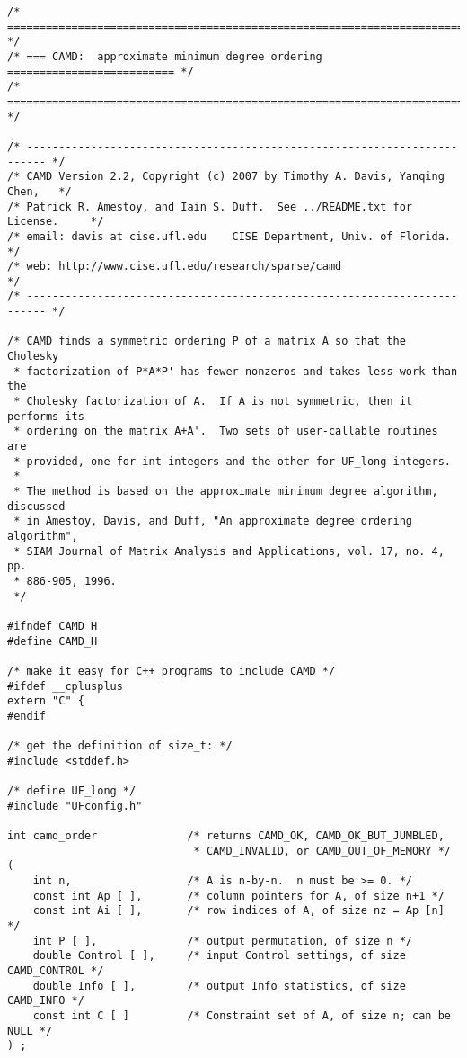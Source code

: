 \documentclass[11pt]{article}
\begin{document}
{\footnotesize
\begin{verbatim}
/* ========================================================================= */
/* === CAMD:  approximate minimum degree ordering ========================== */
/* ========================================================================= */

/* ------------------------------------------------------------------------- */
/* CAMD Version 2.2, Copyright (c) 2007 by Timothy A. Davis, Yanqing Chen,   */
/* Patrick R. Amestoy, and Iain S. Duff.  See ../README.txt for License.     */
/* email: davis at cise.ufl.edu    CISE Department, Univ. of Florida.        */
/* web: http://www.cise.ufl.edu/research/sparse/camd                         */
/* ------------------------------------------------------------------------- */

/* CAMD finds a symmetric ordering P of a matrix A so that the Cholesky
 * factorization of P*A*P' has fewer nonzeros and takes less work than the
 * Cholesky factorization of A.  If A is not symmetric, then it performs its
 * ordering on the matrix A+A'.  Two sets of user-callable routines are
 * provided, one for int integers and the other for UF_long integers.
 *
 * The method is based on the approximate minimum degree algorithm, discussed
 * in Amestoy, Davis, and Duff, "An approximate degree ordering algorithm",
 * SIAM Journal of Matrix Analysis and Applications, vol. 17, no. 4, pp.
 * 886-905, 1996.
 */

#ifndef CAMD_H
#define CAMD_H

/* make it easy for C++ programs to include CAMD */
#ifdef __cplusplus
extern "C" {
#endif

/* get the definition of size_t: */
#include <stddef.h>

/* define UF_long */
#include "UFconfig.h"

int camd_order              /* returns CAMD_OK, CAMD_OK_BUT_JUMBLED,
                             * CAMD_INVALID, or CAMD_OUT_OF_MEMORY */
(
    int n,                  /* A is n-by-n.  n must be >= 0. */
    const int Ap [ ],       /* column pointers for A, of size n+1 */
    const int Ai [ ],       /* row indices of A, of size nz = Ap [n] */
    int P [ ],              /* output permutation, of size n */
    double Control [ ],     /* input Control settings, of size CAMD_CONTROL */
    double Info [ ],        /* output Info statistics, of size CAMD_INFO */
    const int C [ ]         /* Constraint set of A, of size n; can be NULL */
) ;


\end{verbatim}}
\end{document}
